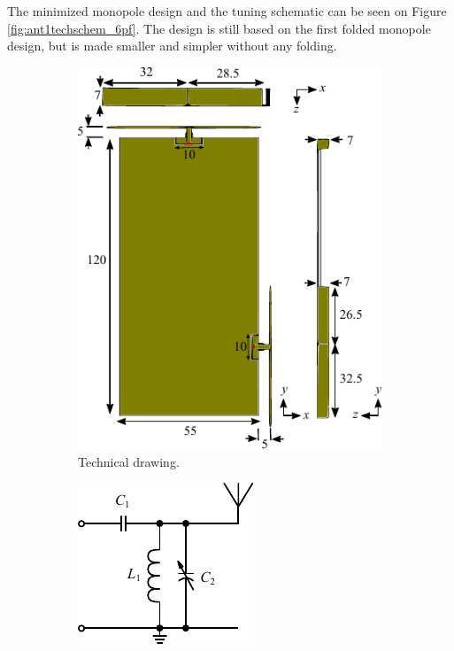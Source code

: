 The minimized monopole design and the tuning schematic can be seen on Figure \ref{fig:ant1techschem_6pf}. The design is still based on the first folded monopole design, but is made smaller and simpler without any folding.

\begin{figure}[htbp]
    \begin{subfigure}[b]{0.49\linewidth}
        \centering
        \includegraphics{img/tech_sol/monopole/5mm/3d_drawing/3d_drawing}
        \caption{Technical drawing.}
        \label{fig:ant1technical_6pf}
    \end{subfigure}
    \hfill
    \begin{subfigure}[b]{0.49\linewidth}
        \centering
        \includegraphics{img/tech_sol/schematic_tuning_1}\\[1cm]
\footnotesize
        \begin{tabular}{|l|l|l|l|}

\end{tabular}
\end{subfigure}
\end{figure}
